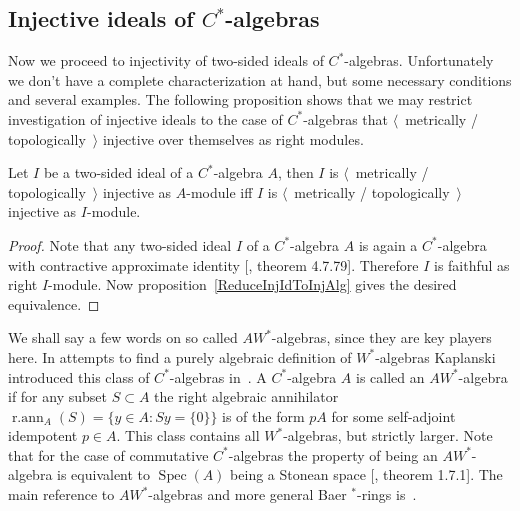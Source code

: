 
\subsection{
    Injective ideals of \texorpdfstring{$C^*$}{C*}-algebras
}\label{SubSectionInjectiveIdealsOfCStarAlgebras}

Now we proceed to injectivity of two-sided ideals of $C^*$-algebras.
Unfortunately we don't have a complete characterization at hand, but some
necessary conditions and several examples. The following proposition shows that
we may restrict investigation of injective ideals to the case of $C^*$-algebras
that $\langle$~metrically / topologically~$\rangle$ injective over themselves as
right modules.

\begin{proposition}\label{MetTopInjOvrAlgIffOvrItslf} Let $I$ be a two-sided
ideal of a $C^*$-algebra $A$, then $I$ is $\langle$~metrically /
topologically~$\rangle$ injective as $A$-module iff $I$ is $\langle$~metrically
/ topologically~$\rangle$ injective as $I$-module.
\end{proposition}
\begin{proof} Note that any two-sided ideal $I$ of a $C^*$-algebra $A$ is again
a $C^*$-algebra with contractive approximate identity [\cite{HelBanLocConvAlg},
theorem 4.7.79]. Therefore $I$ is faithful as right $I$-module. Now
proposition~\ref{ReduceInjIdToInjAlg} gives the desired equivalence.
\end{proof}

We shall say a few words on so called $AW^*$-algebras, since they are key
players here. In attempts to find a purely algebraic definition of
$W^*$-algebras Kaplanski introduced this class of $C^*$-algebras
in~\cite{KaplProjInBanAlg}. A $C^*$-algebra $A$ is called an $AW^*$-algebra if
for any subset $S\subset A$ the right algebraic annihilator
$\operatorname{r.ann}_A(S)= \{y\in A: Sy= \{0 \} \}$ is of the form $pA$ for
some self-adjoint idempotent $p\in A$. This class contains all $W^*$-algebras,
but strictly larger. Note that for the case of commutative $C^*$-algebras the
property of being an $AW^*$-algebra is equivalent to  $\operatorname{Spec}(A)$
being a Stonean space [\cite{BerbBaerStarRings}, theorem 1.7.1]. The main
reference to $AW^*$-algebras and more general Baer ${}^*$-rings
is~\cite{BerbBaerStarRings}. 

